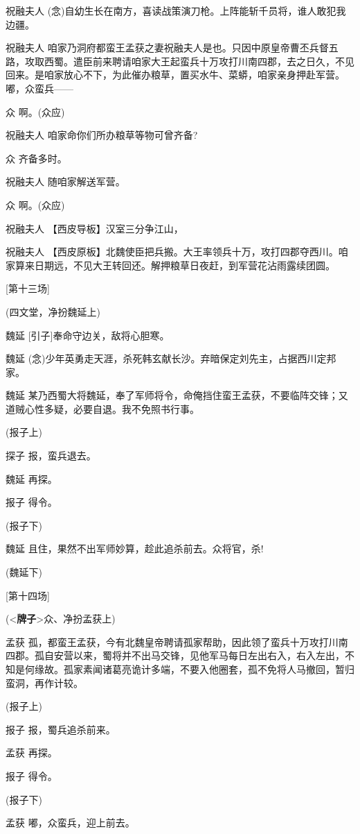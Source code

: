 祝融夫人
(念)自幼生长在南方，喜读战策演刀枪。上阵能斩千员将，谁人敢犯我边疆。

祝融夫人
咱家乃洞府都蛮王孟获之妻祝融夫人是也。只因中原皇帝曹丕兵督五路，攻取西蜀。遣臣前来聘请咱家大王起蛮兵十万攻打川南四郡，去之日久，不见回来。是咱家放心不下，为此催办粮草，置买水牛、菜蟒，咱家亲身押赴军营。嘟，众蛮兵------

众 啊。(众应)

祝融夫人 咱家命你们所办粮草等物可曾齐备?

众 齐备多时。

祝融夫人 随咱家解送军营。

众 啊。(众应)

祝融夫人 【西皮导板】汉室三分争江山，

祝融夫人
【西皮原板】北魏使臣把兵搬。大王率领兵十万，攻打四郡夺西川。咱家算来日期远，不见大王转回还。解押粮草日夜赶，到军营花沾雨露续团圆。

{[}第十三场{]}

(四文堂，净扮魏延上)

魏延 {[}引子{]}奉命守边关，敌将心胆寒。

魏延
(念)少年英勇走天涯，杀死韩玄献长沙。弃暗保定刘先主，占据西川定邦家。

魏延
某乃西蜀大将魏延，奉了军师将令，命俺挡住蛮王孟获，不要临阵交锋；又道贼心性多疑，必要自退。我不免照书行事。

(报子上)

探子 报，蛮兵退去。

魏延 再探。

报子 得令。

(报子下)

魏延 且住，果然不出军师妙算，趁此追杀前去。众将官，杀!

(魏延下)

{[}第十四场{]}

(\textless{}\textbf{牌子}\textgreater{}众、净扮孟获上)

孟获
孤，都蛮王孟获，今有北魏皇帝聘请孤家帮助，因此领了蛮兵十万攻打川南四郡。孤自安营以来，蜀将并不出马交锋，见他军马每日左出右入，右入左出，不知是何缘故。孤家素闻诸葛亮诡计多端，不要入他圈套，孤不免将人马撤回，暂归蛮洞，再作计较。

(报子上)

报子 报，蜀兵追杀前来。

孟获 再探。

报子 得令。

(报子下)

孟获 嘟，众蛮兵，迎上前去。

